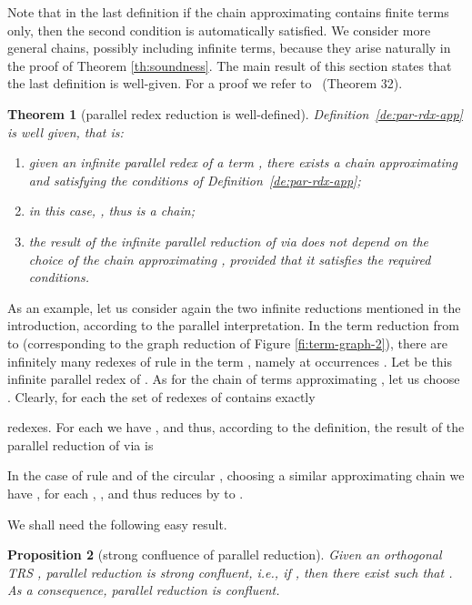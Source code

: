 \documentclass{eptcs}
\theoremstyle{plain}
\newtheorem{theorem}{Theorem} \newtheorem{lemma}[theorem]{Lemma}
\newtheorem{proposition}[theorem]{Proposition}
\theoremstyle{definition}
\begin{document}
Note that in the last definition if the chain approximating 
contains finite terms only, then the second condition is automatically
satisfied. We consider more general chains, possibly including
infinite terms, because they arise
naturally in the proof of Theorem \ref{th:soundness}. 
The main result of this section states that the last definition is 
well-given. For a proof we refer to~\cite{Cor:TRC} (Theorem 32).

\begin{theorem}
[parallel redex reduction is well-defined]
\label{th:WD-ParRdxApp}
Definition~\ref{de:par-rdx-app} is well given, that is:

\begin{enumerate}
\item given an infinite parallel redex  of a term , there
  exists a chain  approximating
   and satisfying the conditions of Definition~\ref{de:par-rdx-app};

\item in this case, , thus  is a chain;

\item the result of the infinite parallel reduction of  via 
  does not depend on the choice of the chain approximating ,
  provided that it satisfies the required conditions.
\end{enumerate}
\end{theorem}


As an example, let us consider again the two infinite reductions 
mentioned 
in the introduction, according to the 
parallel interpretation. 
In the term reduction from  to  (corresponding to 
the 
graph reduction of Figure \ref{fi:term-graph-2}), 
there are infinitely many redexes of rule  
in the term , 
namely at occurrences . Let  be this infinite parallel redex of . 
As for the chain of terms approximating 
, let us choose  . Clearly, for each   
the set  of redexes of  contains exactly 
 
redexes. 
For each  we have , 
and thus, according 
to the definition, the result of the parallel reduction of  
via  is 
 

In the case of rule  and of the circular , choosing a similar 
approximating chain we have   ,  for each , 
, and thus  
reduces 
by  to .  

We shall need the following easy result.
\begin{proposition} 
[strong confluence of parallel reduction]
\label{pr:confluence}
Given an orthogonal TRS , parallel reduction is strong 
confluent, i.e., if , 
then there exist  such that . As a consequence, parallel reduction is 
confluent.
\end{proposition}
\end{document}
